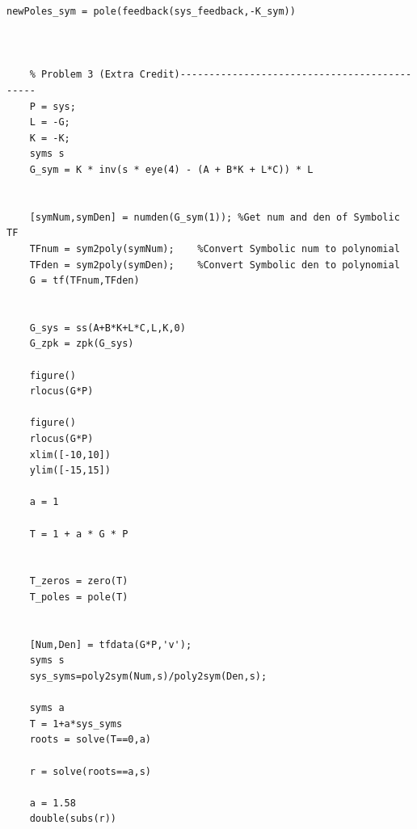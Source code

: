 \documentclass[]{article}
\begin{document}
\begin{Verbatim}[tabsize=4]
	newPoles_sym = pole(feedback(sys_feedback,-K_sym))
	
	
	
	% Problem 3 (Extra Credit)---------------------------------------------
	P = sys;
	L = -G;
	K = -K;
	syms s
	G_sym = K * inv(s * eye(4) - (A + B*K + L*C)) * L
	
	
	[symNum,symDen] = numden(G_sym(1)); %Get num and den of Symbolic TF
	TFnum = sym2poly(symNum);    %Convert Symbolic num to polynomial
	TFden = sym2poly(symDen);    %Convert Symbolic den to polynomial
	G = tf(TFnum,TFden)
	
	
	G_sys = ss(A+B*K+L*C,L,K,0)
	G_zpk = zpk(G_sys)
	
	figure()
	rlocus(G*P)
	
	figure()
	rlocus(G*P)
	xlim([-10,10])
	ylim([-15,15])
	
	a = 1
	
	T = 1 + a * G * P
	
	
	T_zeros = zero(T)
	T_poles = pole(T)
	
	
	[Num,Den] = tfdata(G*P,'v');
	syms s
	sys_syms=poly2sym(Num,s)/poly2sym(Den,s);
	
	syms a
	T = 1+a*sys_syms
	roots = solve(T==0,a)
	
	r = solve(roots==a,s)
	
	a = 1.58
	double(subs(r))
	
\end{Verbatim}
\end{document}
